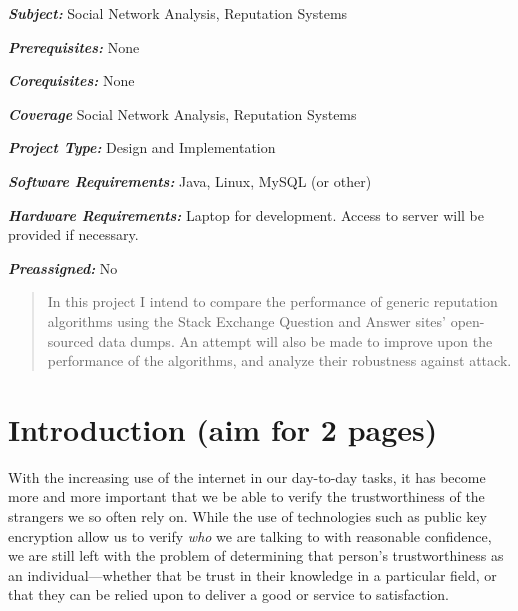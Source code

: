 \documentclass[]{final_report}
\begin{document}
\maketitle
\tableofcontents{}\newpage

\begin{specification}

\textbf{\textsl{Subject:}} Social Network Analysis, Reputation Systems

\textbf{\textsl{Prerequisites:}} None

\textbf{\textsl{Corequisites:}} None

\textbf{\textsl{Coverage}} Social Network Analysis, Reputation Systems

\textbf{\textsl{Project Type:}} Design and Implementation

\textbf{\textsl{Software Requirements:}} Java, Linux, MySQL (or other)

\textbf{\textsl{Hardware Requirements:}} Laptop for development. Access to server will be provided if necessary.

\textbf{\textsl{Preassigned:}} No

\end{specification}


\begin{abstract}

In this project I intend to compare the performance of generic reputation algorithms using the Stack Exchange Question and Answer sites' open-sourced data dumps. An attempt will also be made to improve upon the performance of the algorithms, and analyze their robustness against attack.

\end{abstract}
\newpage


\chapter{Introduction (aim for 2 pages)}

With the increasing use of the internet in our day-to-day tasks, it has become more and more important that we be able to verify the trustworthiness of the strangers we so often rely on. While the use of technologies such as public key encryption allow us to verify \textsl{who} we are talking to with reasonable confidence, we are still left with the problem of determining that person's trustworthiness as an individual---whether that be trust in their knowledge in a particular field, or that they can be relied upon to deliver a good or service to satisfaction.
\end{document}
